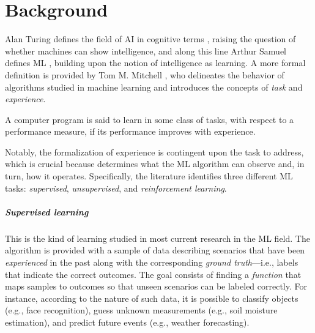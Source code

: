 \documentclass[a4paper,12pt,times,numbered,print,index]{Classes/PhDThesisPSnPDF}
\begin{document}





\chapter{Background}
\label{chap:background}

Alan Turing defines the field of AI in cognitive terms \cite{turing1980computing}, raising the question of whether machines can show intelligence, and along this line Arthur Samuel defines ML \cite{samuel2000some}, building upon the notion of intelligence as learning.
A more formal definition is provided by Tom M. Mitchell \citep{mitchell1997machine}, who delineates the behavior of algorithms studied in machine learning and introduces the concepts of \textit{task} and \textit{experience}.
\begin{definition}
    A computer program is said to learn in some class of tasks, with respect to a performance measure, if its performance improves with experience.
\end{definition}
Notably, the formalization of experience is contingent upon the task to address, which is crucial because determines what the ML algorithm can observe and, in turn, how it operates.
Specifically, the literature identifies three different ML tasks: \textit{supervised}, \textit{unsupervised}, and \textit{reinforcement learning}.

\paragraph{Supervised learning} This is the kind of learning studied in most current research in the ML field. The algorithm is provided with a sample of data describing scenarios that have been \textit{experienced} in the past along with the corresponding \textit{ground truth}---i.e., labels that indicate the correct outcomes.
The goal consists of finding a \textit{function} that maps samples to outcomes so that unseen scenarios can be labeled correctly.
For instance, according to the nature of such data, it is possible to classify objects (e.g., face recognition), guess unknown measurements (e.g., soil moisture estimation), and predict future events (e.g., weather forecasting).
\end{document}
